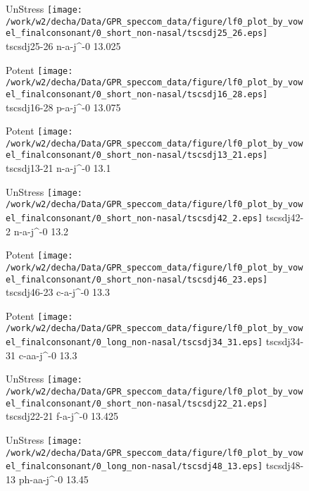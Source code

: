 \documentclass{article}
\begin{document}
\begin{figure}[t]
\begin{minipage}[b]{.24\textwidth}
UnStress
\centering
\texttt{[image: /work/w2/decha/Data/GPR\_speccom\_data/figure/lf0\_plot\_by\_vowel\_finalconsonant/0\_short\_non-nasal/tscsdj25\_26.eps]}
tscsdj25-26 n-a-j\textasciicircum-0 13.025
\end{minipage}
\begin{minipage}[b]{.24\textwidth}
\colorbox{Apricot}{Potent}
\centering
\texttt{[image: /work/w2/decha/Data/GPR\_speccom\_data/figure/lf0\_plot\_by\_vowel\_finalconsonant/0\_short\_non-nasal/tscsdj16\_28.eps]}
tscsdj16-28 p-a-j\textasciicircum-0 13.075
\end{minipage}
\begin{minipage}[b]{.24\textwidth}
\colorbox{Apricot}{Potent}
\centering
\texttt{[image: /work/w2/decha/Data/GPR\_speccom\_data/figure/lf0\_plot\_by\_vowel\_finalconsonant/0\_short\_non-nasal/tscsdj13\_21.eps]}
tscsdj13-21 n-a-j\textasciicircum-0 13.1
\end{minipage}
\begin{minipage}[b]{.24\textwidth}
UnStress
\centering
\texttt{[image: /work/w2/decha/Data/GPR\_speccom\_data/figure/lf0\_plot\_by\_vowel\_finalconsonant/0\_short\_non-nasal/tscsdj42\_2.eps]}
tscsdj42-2 n-a-j\textasciicircum-0 13.2
\end{minipage}
\end{figure}

\begin{figure}[t]
\begin{minipage}[b]{.24\textwidth}
\colorbox{Apricot}{Potent}
\centering
\texttt{[image: /work/w2/decha/Data/GPR\_speccom\_data/figure/lf0\_plot\_by\_vowel\_finalconsonant/0\_short\_non-nasal/tscsdj46\_23.eps]}
tscsdj46-23 c-a-j\textasciicircum-0 13.3
\end{minipage}
\begin{minipage}[b]{.24\textwidth}
\colorbox{Apricot}{Potent}
\centering
\texttt{[image: /work/w2/decha/Data/GPR\_speccom\_data/figure/lf0\_plot\_by\_vowel\_finalconsonant/0\_long\_non-nasal/tscsdj34\_31.eps]}
tscsdj34-31 c-aa-j\textasciicircum-0 13.3
\end{minipage}
\begin{minipage}[b]{.24\textwidth}
UnStress
\centering
\texttt{[image: /work/w2/decha/Data/GPR\_speccom\_data/figure/lf0\_plot\_by\_vowel\_finalconsonant/0\_short\_non-nasal/tscsdj22\_21.eps]}
tscsdj22-21 f-a-j\textasciicircum-0 13.425
\end{minipage}
\begin{minipage}[b]{.24\textwidth}
UnStress
\centering
\texttt{[image: /work/w2/decha/Data/GPR\_speccom\_data/figure/lf0\_plot\_by\_vowel\_finalconsonant/0\_long\_non-nasal/tscsdj48\_13.eps]}
tscsdj48-13 ph-aa-j\textasciicircum-0 13.45
\end{minipage}
\end{figure}
\end{document}
